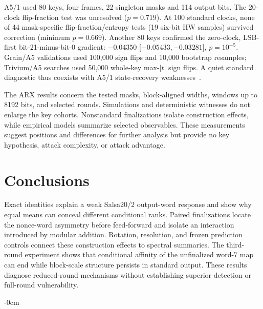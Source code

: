 \documentclass[electronics,article,submit,pdftex,oneauthor]{Definitions/mdpi}
\begin{document}
A5/1 used 80 keys, four frames, 22 singleton masks and 114 output bits. The 20-clock flip-fraction test was unresolved ($p=0.719$). At 100 standard clocks, none of 44 mask-specific flip-fraction/entropy tests (19 six-bit HW samples) survived correction (minimum $p=0.669$). Another 80 keys confirmed the zero-clock, LSB-first bit-21-minus-bit-0 gradient: $-0.04350$ [$-0.05433,-0.03281$], $p=10^{-5}$. Grain/A5 validations used 100,000 sign flips and 10,000 bootstrap resamples; Trivium/A5 searches used 50,000 whole-key max-$|t|$ sign flips. A quiet standard diagnostic thus coexists with A5/1 state-recovery weaknesses~\citep{biryukov2000}.

The ARX results concern the tested masks, block-aligned widths, windows up to 8192 bits, and selected rounds. Simulations and deterministic witnesses do not enlarge the key cohorts. Nonstandard finalizations isolate construction effects, while empirical models summarize selected observables. These measurements suggest positions and differences for further analysis but provide no key hypothesis, attack complexity, or attack advantage.

\section{Conclusions}

Exact identities explain a weak Salsa20/2 output-word response and show why equal means can conceal different conditional ranks. Paired finalizations locate the nonce-word asymmetry before feed-forward and isolate an interaction introduced by modular addition. Rotation, resolution, and frozen prediction controls connect these construction effects to spectral summaries. The third-round experiment shows that conditional affinity of the unfinalized word-7 map can end while block-scale structure persists in standard output. These results diagnose reduced-round mechanisms without establishing superior detection or full-round vulnerability.

\begin{adjustwidth}{-\extralength}{0cm}
\raggedright

\end{adjustwidth}
\end{document}
